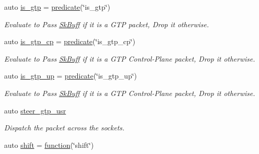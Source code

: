 \begin{DoxyCompactItemize}
auto \hyperlink{namespacepfq_1_1lang_1_1experimental_1_1anonymous__namespace_02experimental_8hpp_03_a2eb9e54a6fc6170b246cf3149445a2c4}{is\+\_\+gtp} = \hyperlink{namespacepfq_1_1lang_aca9adafc436b7f851621b979fa1aaf88}{predicate}(\char`\"{}is\+\_\+gtp\char`\"{})
\begin{DoxyCompactList}\small\item\em Evaluate to {\ttfamily Pass} \hyperlink{structpfq_1_1lang_1_1SkBuff}{Sk\+Buff} if it is a G\+TP packet, {\ttfamily Drop} it otherwise. \end{DoxyCompactList}\item 
auto \hyperlink{namespacepfq_1_1lang_1_1experimental_1_1anonymous__namespace_02experimental_8hpp_03_ade25d79513e3131a54a05e23d25a7539}{is\+\_\+gtp\+\_\+cp} = \hyperlink{namespacepfq_1_1lang_aca9adafc436b7f851621b979fa1aaf88}{predicate}(\char`\"{}is\+\_\+gtp\+\_\+cp\char`\"{})
\begin{DoxyCompactList}\small\item\em Evaluate to {\ttfamily Pass} \hyperlink{structpfq_1_1lang_1_1SkBuff}{Sk\+Buff} if it is a G\+TP Control-\/\+Plane packet, {\ttfamily Drop} it otherwise. \end{DoxyCompactList}\item 
auto \hyperlink{namespacepfq_1_1lang_1_1experimental_1_1anonymous__namespace_02experimental_8hpp_03_a8c12f3cb8c8faaab619e0feb874ed0c3}{is\+\_\+gtp\+\_\+up} = \hyperlink{namespacepfq_1_1lang_aca9adafc436b7f851621b979fa1aaf88}{predicate}(\char`\"{}is\+\_\+gtp\+\_\+up\char`\"{})
\begin{DoxyCompactList}\small\item\em Evaluate to {\ttfamily Pass} \hyperlink{structpfq_1_1lang_1_1SkBuff}{Sk\+Buff} if it is a G\+TP Control-\/\+Plane packet, {\ttfamily Drop} it otherwise. \end{DoxyCompactList}\item 
auto \hyperlink{namespacepfq_1_1lang_1_1experimental_1_1anonymous__namespace_02experimental_8hpp_03_a6b08a2b49251677736f1939eaadac4a6}{steer\+\_\+gtp\+\_\+usr}
\begin{DoxyCompactList}\small\item\em Dispatch the packet across the sockets. \end{DoxyCompactList}\item 
auto \hyperlink{namespacepfq_1_1lang_1_1experimental_1_1anonymous__namespace_02experimental_8hpp_03_ae2d4991027ccd4f2ad64a1e02bfa4679}{shift} = \hyperlink{namespacepfq_1_1lang_a1a4638059d700ae08d0ca63886ff2bb3}{function}(\char`\"{}shift\char`\"{})

\end{DoxyCompactItemize}
